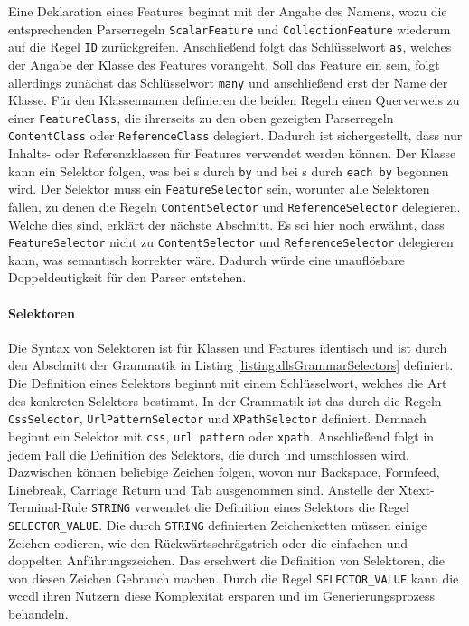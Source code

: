     Eine Deklaration eines Features beginnt mit der Angabe des Namens,
    wozu die entsprechenden Parserregeln \texttt{ScalarFeature} und \texttt{CollectionFeature}
    wiederum auf die Regel \texttt{ID} zurückgreifen.    
    Anschließend folgt das Schlüsselwort \texttt{as}, welches der Angabe der Klasse
    des Features vorangeht.
    Soll das Feature ein {\collectionFeature} sein, folgt allerdings zunächst das
    Schlüsselwort \texttt{many} und anschließend erst der Name der Klasse.
    Für den Klassennamen definieren die beiden Regeln einen Querverweis zu einer \texttt{FeatureClass},
    die ihrerseits zu den oben gezeigten Parserregeln \texttt{ContentClass} oder
    \texttt{ReferenceClass} delegiert.
    Dadurch ist sichergestellt, dass nur Inhalts- oder Referenzklassen für Features verwendet werden können.
    Der Klasse kann ein Selektor folgen,
    was bei {\scalarFeature}s durch \texttt{by} und bei
    {\collectionFeature}s durch \texttt{each by} begonnen wird.
    Der Selektor muss ein \texttt{FeatureSelector} sein,
    worunter alle Selektoren fallen, zu denen die Regeln \texttt{ContentSelector}
    und \texttt{ReferenceSelector} delegieren.
    Welche dies sind, erklärt der nächste Abschnitt.
    Es sei hier noch erwähnt, dass \texttt{FeatureSelector} nicht zu
    \texttt{ContentSelector} und \texttt{ReferenceSelector} delegieren kann,
    was semantisch korrekter wäre.
    Dadurch würde eine unauflösbare Doppeldeutigkeit für den Parser entstehen.

    \paragraph{Selektoren}
    Die Syntax von Selektoren ist für Klassen und Features identisch
    und ist durch den Abschnitt der Grammatik in Listing \ref{listing:dlsGrammarSelectors} definiert.
    Die Definition eines Selektors beginnt mit einem Schlüsselwort,
    welches die Art des konkreten Selektors bestimmt.
    In der Grammatik ist das durch die Regeln
    \texttt{CssSelector}, \texttt{UrlPatternSelector} und \texttt{XPathSelector} definiert.
    Demnach beginnt ein Selektor mit \texttt{css}, \texttt{url pattern} oder \texttt{xpath}.
    Anschließend folgt in jedem Fall die Definition des Selektors,
    die durch {\flqq } und {\frqq } umschlossen wird.
    Dazwischen können beliebige Zeichen folgen, wovon
    nur Backspace, Formfeed, Linebreak, Carriage Return und Tab ausgenommen sind.
    Anstelle der Xtext-Terminal-Rule \texttt{STRING} \cite[Kapitel "`Common Terminals"']{xtext:documentation}
    verwendet die Definition eines Selektors die Regel \texttt{SELECTOR\_VALUE}.
    Die durch \texttt{STRING} definierten Zeichenketten müssen einige Zeichen codieren,
    wie den Rückwärtsschrägstrich oder die einfachen und doppelten Anführungszeichen.
    Das erschwert die Definition von Selektoren, die von diesen Zeichen Gebrauch machen.
    Durch die Regel \texttt{SELECTOR\_VALUE} kann die \gls{wccdl} ihren Nutzern diese Komplexität
    ersparen und im Generierungsprozess behandeln.

